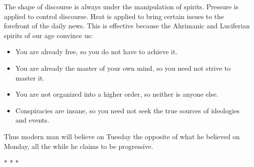 The shape of discourse is always under the manipulation of spirits. Pressure is applied to control discourse. Heat is applied to bring certain issues to the forefront of the daily news. This is effective because the Ahrimanic and Luciferian spirits of our age convince us:

\begin{itemize}


\item You are already free, so you do not have to achieve it.

\item You are already the master of your own mind, so you need not strive to master it.

\item You are not organized into a higher order, so neither is anyone else.

\item Conspiracies are insane, so you need not seek the true sources of ideologies and events.
\end{itemize}


Thus modern man will believe on Tuesday the opposite of what he believed on Monday, all the while he claims to be progressive.



\begin{center}* * *\end{center}

